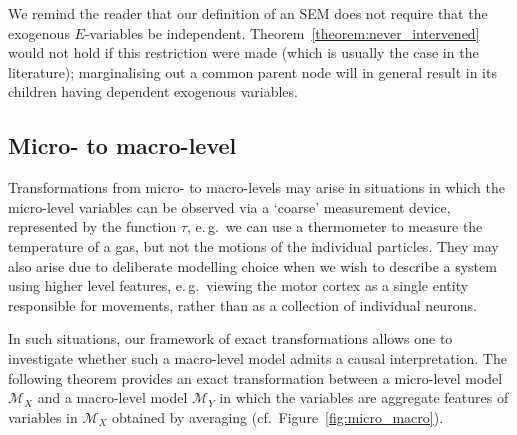 We remind the reader that our definition of an SEM does not require that the exogenous $E$-variables be independent. 
Theorem~\ref{theorem:never_intervened} would not hold if this restriction were made (which is usually the case in the literature); marginalising out a common parent node will in general result in its children having dependent exogenous variables.

\subsection{Micro- to macro-level}\label{subsection:micromacro}

Transformations from micro- to macro-levels may arise in situations in which the micro-level variables can be observed via a `coarse' measurement device, represented by the function $\tau$, e.\,g.\ we can use a thermometer to measure the temperature of a gas, but not the motions of the individual particles. They may also arise due to deliberate modelling choice when we wish to describe a system using higher level features, e.\,g.\ viewing the motor cortex as a single entity responsible for movements, rather than as a collection of individual neurons.

In such situations, our framework of exact transformations allows one to investigate whether such a macro-level model admits a causal interpretation. The following theorem provides an exact transformation between a micro-level model $\mathcal{M}_X$ and a macro-level model $\mathcal{M}_Y$ in which the variables are aggregate features of variables in $\mathcal{M}_X$ obtained by averaging (cf.\ Figure~\ref{fig:micro_macro}).

